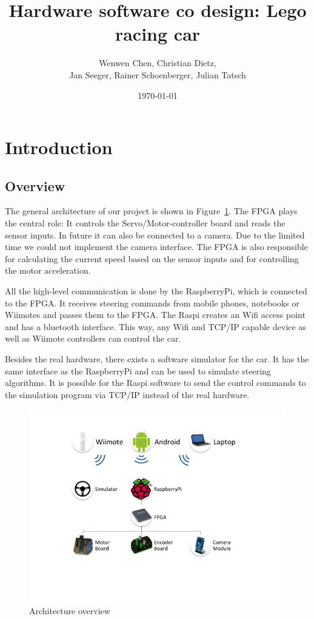 \documentclass[a4paper
               ,10pt
               ,DIV=10 %
               ,BCOR=0.3cm
               ,pagesize %
               ,headings=small
               ,bibtotoc
               ]
               {scrartcl}
\title{Hardware software co design: Lego racing car}
\author{Wenwen Chen, Christian Dietz, \\
	Jan Seeger, Rainer Schoenberger, Julian Tatsch
}
\date{\today}
\begin{document}
\maketitle

\tableofcontents
\section{Introduction}
\subsection{Overview}

The general architecture of our project is shown in Figure~\ref{figarchitecture}.
The FPGA plays the central role:
It controls the Servo/Motor-controller board and reads the sensor inputs.
In future it can also be connected to a camera.
Due to the limited time we could not implement the camera interface.
The FPGA is also responsible for calculating the current speed based on the sensor inputs and for controlling the motor acceleration.

All the high-level communication is done by the RaspberryPi, which is connected to the FPGA.
It receives steering commands from mobile phones, notebooks or Wiimotes and passes them to the FPGA.
The Raspi creates an Wifi access point and has a bluetooth interface.
This way, any Wifi and TCP/IP capable device as well as Wiimote controllers can control the car.

Besides the real hardware, there exists a software simulator for the car.
It has the same interface as the RaspberryPi and can be used to simulate steering algorithms.
It is possible for the Raspi software to send the control commands to the simulation program via TCP/IP instead of the real hardware.

\begin{figure}[H]
\begin{center}
\includegraphics[width=\linewidth]{pic/architecture}
\caption{Architecture overview}
\label{figarchitecture}
\end{center}
\end{figure}
\end{document}
